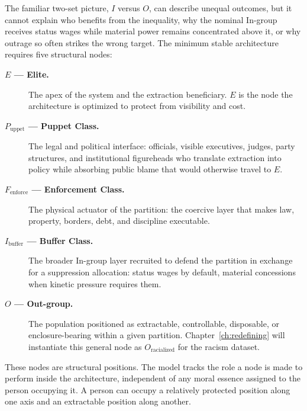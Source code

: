The familiar two-set picture, $I$ versus $O$, can describe unequal outcomes,
but it cannot explain who benefits from the inequality, why the nominal In-group
receives status wages while material power remains concentrated above it, or why outrage so often
strikes the wrong target. The minimum stable architecture requires five
structural nodes:

\begin{description}
    \item[\textbf{$E$ --- Elite.}] The apex of the system and the extraction
    beneficiary. $E$ is the node the architecture is optimized to protect from
    visibility and cost.

    \item[\textbf{$P_{\text{uppet}}$ --- Puppet Class.}] The legal and political
    interface: officials, visible executives, judges, party structures, and
    institutional figureheads who translate extraction into policy while
    absorbing public blame that would otherwise travel to $E$.

    \item[\textbf{$F_{\text{enforce}}$ --- Enforcement Class.}] The physical
    actuator of the partition: the coercive layer that makes law, property,
    borders, debt, and discipline executable.

    \item[\textbf{$I_{\text{buffer}}$ --- Buffer Class.}] The broader In-group
    layer recruited to defend the partition in exchange for a suppression
    allocation: status wages by default, material concessions when kinetic
    pressure requires them.

    \item[\textbf{$O$ --- Out-group.}] The population positioned as extractable,
    controllable, disposable, or enclosure-bearing within a given partition.
    Chapter~\ref{ch:redefining} will instantiate this general node as
    $O_{\text{racialized}}$ for the racism dataset.
\end{description}

These nodes are structural positions. The model tracks the role a node is made to perform inside the architecture, independent of any moral essence assigned to the person occupying it. A person can occupy a
relatively protected position along one axis and an extractable position along
another.

